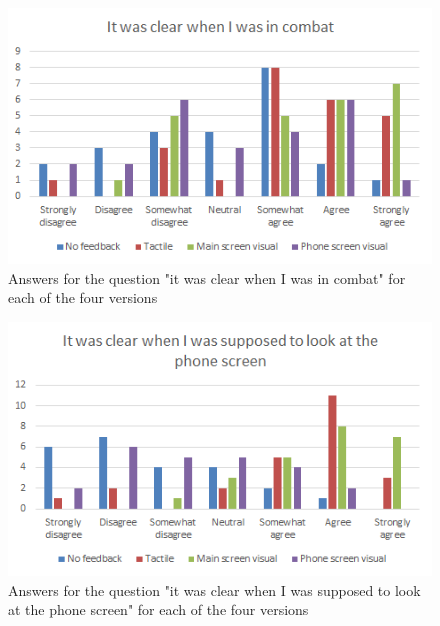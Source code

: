 \begin{figure}[hp!]
	\centering
	\includegraphics[scale=1]{figures/questionnaire_b.png}
	\caption{Answers for the question "it was clear when I was in combat" for each of the four versions}\label{fig:questionnaire_b}
\end{figure}


\begin{figure}[hp!]
	\centering
	\includegraphics[scale=1]{figures/questionnaire_c.png}
	\caption{Answers for the question "it was clear when I was supposed to look at the phone screen" for each of the four versions}\label{fig:questionnaire_c}
\end{figure}

